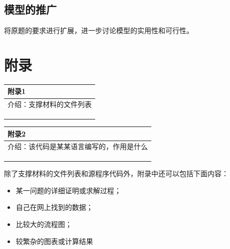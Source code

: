 \documentclass{my_paper}
\begin{document}
\subsection{模型的推广}
将原题的要求进行扩展，进一步讨论模型的实用性和可行性。

\begin{center}
\end{center}

\newpage
\section{附录}

\begin{table}[htbp]
    \centering
    \begin{tabular}{|p{14.0cm}|}
    \hline
    \textbf{附录1} \\ %
    \hline
    介绍：支撑材料的文件列表  \\ 
    \\
    \\
    \\
    \hline
    \end{tabular}
\end{table}

\begin{table}[htbp]
    \centering
    \begin{tabular}{|p{14.0cm}|}
    \hline
    \textbf{附录2} \\ %
    \hline
    介绍：该代码是某某语言编写的，作用是什么   \\ 
    \\
    \\
    \\
    \hline
    \end{tabular}
\end{table}

除了支撑材料的文件列表和源程序代码外，附录中还可以包括下面内容：
\begin{itemize}
\item 某一问题的详细证明或求解过程；
\item 自己在网上找到的数据；
\item 比较大的流程图；
\item 较繁杂的图表或计算结果
\end{itemize}
\end{document}

